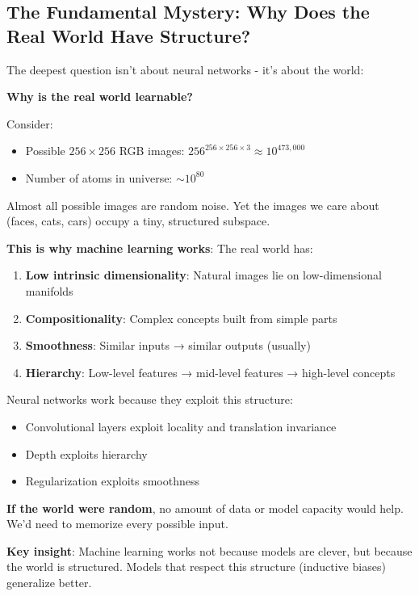 \documentclass[11pt,oneside]{book}
\begin{document}
\subsection{The Fundamental Mystery: Why Does the Real World Have Structure?}

The deepest question isn't about neural networks - it's about the world:

\textbf{Why is the real world learnable?}

Consider:
\begin{itemize}
\item Possible $256 \times 256$ RGB images: $256^{256 \times 256 \times 3} \approx 10^{473{,}000}$
\item Number of atoms in universe: $\sim 10^{80}$
\end{itemize}

Almost all possible images are random noise. Yet the images we care about (faces, cats, cars) occupy a tiny, structured subspace.

\textbf{This is why machine learning works}: The real world has:
\begin{enumerate}
\item \textbf{Low intrinsic dimensionality}: Natural images lie on low-dimensional manifolds
\item \textbf{Compositionality}: Complex concepts built from simple parts
\item \textbf{Smoothness}: Similar inputs → similar outputs (usually)
\item \textbf{Hierarchy}: Low-level features → mid-level features → high-level concepts
\end{enumerate}

Neural networks work because they exploit this structure:
\begin{itemize}
\item Convolutional layers exploit locality and translation invariance
\item Depth exploits hierarchy
\item Regularization exploits smoothness
\end{itemize}

\textbf{If the world were random}, no amount of data or model capacity would help. We'd need to memorize every possible input.

\textbf{Key insight}: Machine learning works not because models are clever, but because the world is structured. Models that respect this structure (inductive biases) generalize better.
\end{document}
